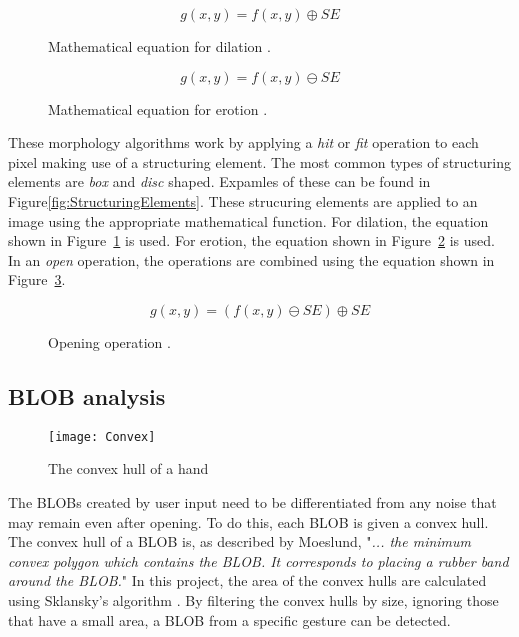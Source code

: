 \begin{figure}[!h]
	\centering
	\begin{displaymath}
	g(x, y) = f(x, y) \oplus SE
	\end{displaymath}
	\caption{Mathematical equation for dilation \citep{moeslund_introduction_2012}. \label{fig:dilateEquation}}
\end{figure}

\begin{figure}[!h]
	\centering
	\begin{displaymath}
	g(x, y) = f(x, y) \ominus SE
	\end{displaymath}
	\caption{Mathematical equation for erotion \citep{moeslund_introduction_2012}. \label{fig:erodeEquation}}
\end{figure}

These morphology algorithms work by applying a \textit{hit} or \textit{fit} operation to each pixel making use of a structuring element. The most common types of structuring elements are \textit{box} and \textit{disc} shaped. Expamles of these can be found in Figure\ref{fig:StructuringElements}. These strucuring elements are applied to an image using the appropriate mathematical function. For dilation, the equation shown in Figure~\ref{fig:dilateEquation} is used. For erotion, the equation shown in Figure~\ref{fig:erodeEquation} is used. In an \textit{open} operation, the operations are combined using the equation shown in Figure~\ref{fig:openingEquation}.

\begin{figure}[!h]
	\centering
	\begin{displaymath}
	g(x, y) = (f(x, y) \ominus SE) \oplus SE
	\end{displaymath}
	\caption{Opening operation \citep{moeslund_introduction_2012}. \label{fig:openingEquation}}
\end{figure}

\subsection{BLOB analysis}
\begin{wrapfigure}{r}{0.32\textwidth}
\begin{center}
\texttt{[image: Convex]}
\end{center}
\caption{The convex hull of a hand \label{Fig:Convex}}
\end{wrapfigure}
The BLOBs created by user input need to be differentiated from any noise that may remain even after opening. To do this, each BLOB is given a convex hull. The convex hull of a BLOB is, as described by Moeslund, "\textit{... the minimum convex polygon which contains the BLOB. It corresponds to placing a rubber band around the BLOB.}" \citep{moeslund_introduction_2012} In this project, the area of the convex hulls are calculated using Sklansky's algorithm \citep{Sklansky198279}. By filtering the convex hulls by size, ignoring those that have a small area, a BLOB from a specific gesture can be detected.

